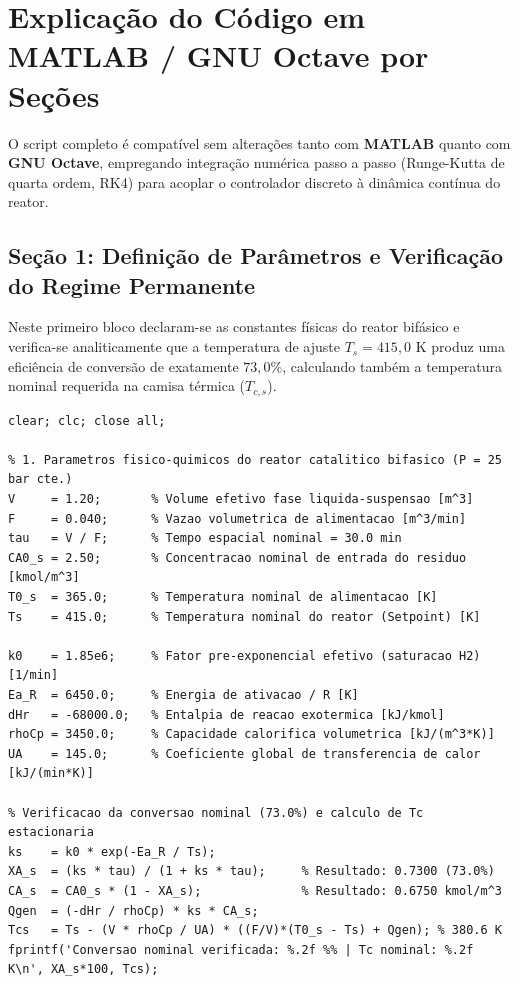 \documentclass[11pt, a4paper]{article}
\begin{document}
\section{Explicação do Código em MATLAB / GNU Octave por Seções}

O script completo é compatível sem alterações tanto com \textbf{MATLAB} quanto com \textbf{GNU Octave}, empregando integração numérica passo a passo (Runge-Kutta de quarta ordem, RK4) para acoplar o controlador discreto à dinâmica contínua do reator.

\subsection{Seção 1: Definição de Parâmetros e Verificação do Regime Permanente}
Neste primeiro bloco declaram-se as constantes físicas do reator bifásico e verifica-se analiticamente que a temperatura de ajuste $T_s = 415{,}0\text{ K}$ produz uma eficiência de conversão de exatamente $73{,}0\%$, calculando também a temperatura nominal requerida na camisa térmica ($T_{c,s}$).

\begin{lstlisting}
clear; clc; close all;

% 1. Parametros fisico-quimicos do reator catalitico bifasico (P = 25 bar cte.)
V     = 1.20;       % Volume efetivo fase liquida-suspensao [m^3]
F     = 0.040;      % Vazao volumetrica de alimentacao [m^3/min]
tau   = V / F;      % Tempo espacial nominal = 30.0 min
CA0_s = 2.50;       % Concentracao nominal de entrada do residuo [kmol/m^3]
T0_s  = 365.0;      % Temperatura nominal de alimentacao [K]
Ts    = 415.0;      % Temperatura nominal do reator (Setpoint) [K]

k0    = 1.85e6;     % Fator pre-exponencial efetivo (saturacao H2) [1/min]
Ea_R  = 6450.0;     % Energia de ativacao / R [K]
dHr   = -68000.0;   % Entalpia de reacao exotermica [kJ/kmol]
rhoCp = 3450.0;     % Capacidade calorifica volumetrica [kJ/(m^3*K)]
UA    = 145.0;      % Coeficiente global de transferencia de calor [kJ/(min*K)]

% Verificacao da conversao nominal (73.0%) e calculo de Tc estacionaria
ks    = k0 * exp(-Ea_R / Ts);
XA_s  = (ks * tau) / (1 + ks * tau);     % Resultado: 0.7300 (73.0%)
CA_s  = CA0_s * (1 - XA_s);              % Resultado: 0.6750 kmol/m^3
Qgen  = (-dHr / rhoCp) * ks * CA_s;
Tcs   = Ts - (V * rhoCp / UA) * ((F/V)*(T0_s - Ts) + Qgen); % 380.6 K
fprintf('Conversao nominal verificada: %.2f %% | Tc nominal: %.2f K\n', XA_s*100, Tcs);
\end{lstlisting}
\end{document}
